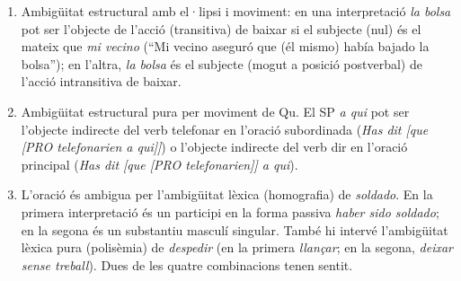 \begin{enumerate}
\begin{enumerate}
      \item Ambigüitat estructural amb el·lipsi i moviment: en una
        interpretació \emph{la bolsa} pot ser l'objecte de l'acció
        (transitiva) de baixar si el subjecte (nul) és el mateix que
        \emph{mi vecino} (``Mi vecino aseguró que (él mismo) había
        bajado la bolsa''); en l'altra, \emph{la bolsa} és el subjecte
        (mogut a posició postverbal) de l'acció intransitiva de
        baixar.
      \item Ambigüitat estructural pura per moviment de Qu. El SP
        \emph{a qui} pot ser l'objecte indirecte del verb telefonar en
        l'oració subordinada (\emph{Has dit [que [PRO telefonarien a
          qui]]}) o l'objecte indirecte del verb dir en l'oració
        principal (\emph{Has dit [que [PRO telefonarien]] a qui}).
      \item  L'oració és ambigua per l'ambigüitat lèxica
        (homografia) de \emph{soldado}. En la primera interpretació
        és un participi en la forma passiva \emph{haber sido soldado};
        en la segona és un substantiu masculí singular. També hi
        intervé l'ambigüitat lèxica pura (polisèmia) de
        \emph{despedir} (en la primera \emph{llançar}; en la segona,
        \emph{deixar sense treball}). Dues de les quatre combinacions
        tenen sentit.


\end{enumerate}
\end{enumerate}
